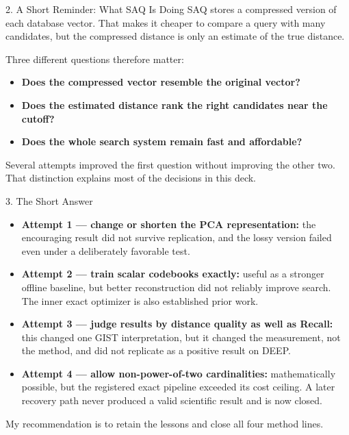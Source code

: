 \documentclass[
  ignorenonframetext,
  aspectratio=169,
]{beamer}
\providecommand{\tightlist}{%
  \setlength{\itemsep}{0pt}\setlength{\parskip}{0pt}}
\begin{document}
\begin{frame}{2. A Short Reminder: What SAQ Is Doing}
\protect{}\label{2-a-short-reminder-what-saq-is-doing}
SAQ stores a compressed version of each database vector. That makes it
cheaper to compare a query with many candidates, but the compressed
distance is only an estimate of the true distance.

Three different questions therefore matter:

\begin{itemize}
\tightlist
\item
  \textbf{Does the compressed vector resemble the original vector?}
\item
  \textbf{Does the estimated distance rank the right candidates near the
  cutoff?}
\item
  \textbf{Does the whole search system remain fast and affordable?}
\end{itemize}

Several attempts improved the first question without improving the other
two. That distinction explains most of the decisions in this deck.
\end{frame}

\begin{frame}{3. The Short Answer}
\protect{}\label{3-the-short-answer}
\begin{itemize}
\tightlist
\item
  \textbf{Attempt 1 --- change or shorten the PCA representation:} the
  encouraging result did not survive replication, and the lossy version
  failed even under a deliberately favorable test.
\item
  \textbf{Attempt 2 --- train scalar codebooks exactly:} useful as a
  stronger offline baseline, but better reconstruction did not reliably
  improve search. The inner exact optimizer is also established prior
  work.
\item
  \textbf{Attempt 3 --- judge results by distance quality as well as
  Recall:} this changed one GIST interpretation, but it changed the
  measurement, not the method, and did not replicate as a positive
  result on DEEP.
\item
  \textbf{Attempt 4 --- allow non-power-of-two cardinalities:}
  mathematically possible, but the registered exact pipeline exceeded
  its cost ceiling. A later recovery path never produced a valid
  scientific result and is now closed.
\end{itemize}

My recommendation is to retain the lessons and close all four method
lines.
\end{frame}
\end{document}
